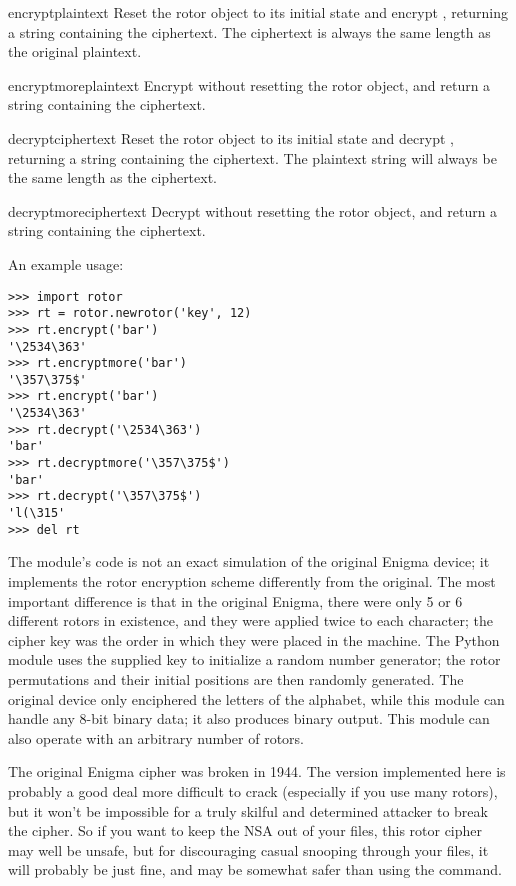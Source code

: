 \begin{methoddesc}[rotor]{encrypt}{plaintext}
Reset the rotor object to its initial state and encrypt ,
returning a string containing the ciphertext.  The ciphertext is always the
same length as the original plaintext.
\end{methoddesc}

\begin{methoddesc}[rotor]{encryptmore}{plaintext}
Encrypt  without resetting the rotor object, and return a
string containing the ciphertext.
\end{methoddesc}

\begin{methoddesc}[rotor]{decrypt}{ciphertext}
Reset the rotor object to its initial state and decrypt ,
returning a string containing the ciphertext.  The plaintext string will
always be the same length as the ciphertext.
\end{methoddesc}

\begin{methoddesc}[rotor]{decryptmore}{ciphertext}
Decrypt  without resetting the rotor object, and return a
string containing the ciphertext.
\end{methoddesc}

An example usage:
\begin{verbatim}
>>> import rotor
>>> rt = rotor.newrotor('key', 12)
>>> rt.encrypt('bar')
'\2534\363'
>>> rt.encryptmore('bar')
'\357\375$'
>>> rt.encrypt('bar')
'\2534\363'
>>> rt.decrypt('\2534\363')
'bar'
>>> rt.decryptmore('\357\375$')
'bar'
>>> rt.decrypt('\357\375$')
'l(\315'
>>> del rt
\end{verbatim}

The module's code is not an exact simulation of the original Enigma
device; it implements the rotor encryption scheme differently from the
original. The most important difference is that in the original
Enigma, there were only 5 or 6 different rotors in existence, and they
were applied twice to each character; the cipher key was the order in
which they were placed in the machine.  The Python 
module uses the supplied key to initialize a random number generator;
the rotor permutations and their initial positions are then randomly
generated.  The original device only enciphered the letters of the
alphabet, while this module can handle any 8-bit binary data; it also
produces binary output.  This module can also operate with an
arbitrary number of rotors.

The original Enigma cipher was broken in 1944. %
The version implemented here is probably a good deal more difficult to crack
(especially if you use many rotors), but it won't be impossible for
a truly skilful and determined attacker to break the cipher.  So if you want
to keep the NSA out of your files, this rotor cipher may well be unsafe, but
for discouraging casual snooping through your files, it will probably be
just fine, and may be somewhat safer than using the \UNIX{} 
command.
